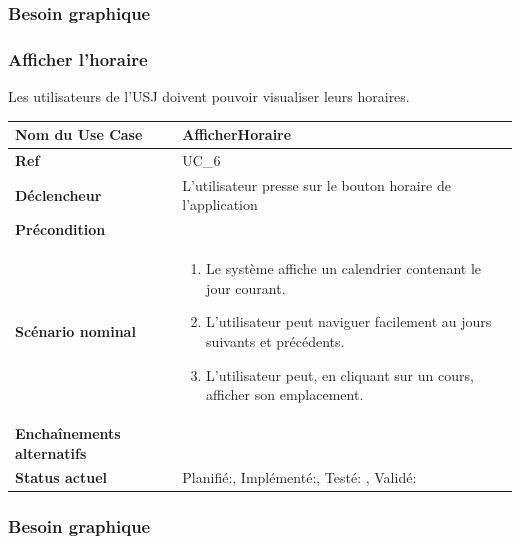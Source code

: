 			\subsubsection*{Besoin graphique}



			\subsubsection{Afficher l'horaire}
								Les utilisateurs de l'USJ  doivent pouvoir visualiser leurs horaires.\\[0.2cm]
								\begin{longtable}{|l|p{10cm}|}
									\hline \textbf{Nom du Use Case} & AfficherHoraire \\ 
									\hline \textbf{Ref} & UC\_6  \\ 
									\hline \textbf{Déclencheur} & L'utilisateur presse sur le bouton horaire de l'application \\
									\hline \textbf{Précondition} &  \\
									\hline \textbf{Scénario nominal} & 
									\begin{enumerate}
										\item Le système affiche un calendrier contenant le jour courant. 
										\item L'utilisateur peut naviguer facilement au jours suivants et précédents. 
										\item L'utilisateur peut, en cliquant sur un cours, afficher son emplacement.
									\end{enumerate}
									\\ 
									\hline \textbf{Enchaînements alternatifs} & \\
									\hline \textbf{Status actuel} & Planifié:\CheckedBox , Implémenté:\CheckedBox  , Testé: \CheckedBox  , Validé: \CheckedBox	  \\
									\hline 
								\end{longtable} 
						\subsubsection*{Besoin graphique}
			
